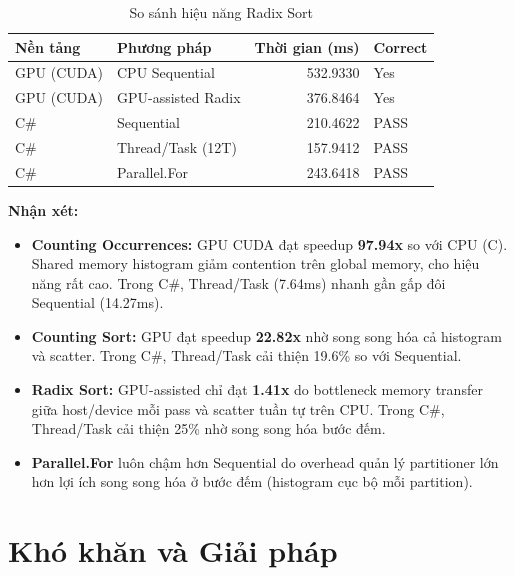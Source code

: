 \documentclass[12pt,a4paper]{article}
\begin{document}
\begin{table}[H]
\centering
\caption{So sánh hiệu năng Radix Sort}
\begin{tabular}{llrl}
\toprule
\textbf{Nền tảng} & \textbf{Phương pháp} & \textbf{Thời gian (ms)} & \textbf{Correct} \\
\midrule
GPU (CUDA)   & CPU Sequential          & 532.9330  & Yes \\
GPU (CUDA)   & GPU-assisted Radix      & 376.8464  & Yes \\
\midrule
C\#          & Sequential              & 210.4622 & PASS \\
C\#          & Thread/Task (12T)       & 157.9412 & PASS \\
C\#          & Parallel.For            & 243.6418 & PASS \\
\bottomrule
\end{tabular}
\end{table}

\textbf{Nhận xét:}
\begin{itemize}[nosep]
    \item \textbf{Counting Occurrences:} GPU CUDA đạt speedup \textbf{97.94x} so với CPU (C). Shared memory histogram giảm contention trên global memory, cho hiệu năng rất cao. Trong C\#, Thread/Task (7.64ms) nhanh gần gấp đôi Sequential (14.27ms).
    \item \textbf{Counting Sort:} GPU đạt speedup \textbf{22.82x} nhờ song song hóa cả histogram và scatter. Trong C\#, Thread/Task cải thiện 19.6\% so với Sequential.
    \item \textbf{Radix Sort:} GPU-assisted chỉ đạt \textbf{1.41x} do bottleneck memory transfer giữa host/device mỗi pass và scatter tuần tự trên CPU. Trong C\#, Thread/Task cải thiện 25\% nhờ song song hóa bước đếm.
    \item \textbf{Parallel.For} luôn chậm hơn Sequential do overhead quản lý partitioner lớn hơn lợi ích song song hóa ở bước đếm (histogram cục bộ mỗi partition).
\end{itemize}

\section{Khó khăn và Giải pháp}
\end{document}

